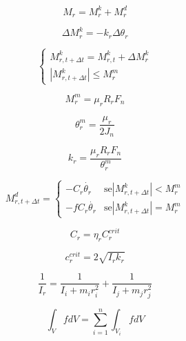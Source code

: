 		\begin{equation}
			M_{r} = M^k_{r} + M^d_{r}
		\end{equation}
		
		\begin{equation}
			\Delta M^k_{r} = -k_{r} \Delta \theta_{r}
		\end{equation}

		\begin{equation}
				\begin{cases}
					M^k_{r,t+\Delta t} = M^k_{r,t} + \Delta M^k_{r} \\
					\left| M^k_{r,t + \Delta t} \right| \leq M^m_{r}
				\end{cases}
		\end{equation}
		
		\begin{equation}
			M^m_{r} = \mu_{r} R_{r} F_{n}
		\end{equation}

		\begin{equation}
			\theta^m_{r} = \frac{\mu_{r}}{2J_{n}}
		\end{equation}

		\begin{equation}
			k_{r} = \frac{\mu_{r}R_{r}F_{n}}{\theta^m_{r}}
		\end{equation}
		
		\begin{equation}
				M^d_{r,t + \Delta t}
				= 
				\begin{cases}
					-C_{r}\dot{\theta_{r}} & \text{se} \left| M^k_{r,t+ \Delta t} \right| < M^m_{r} \\
					-fC_{r}\dot{\theta_{r}} & \text{se} \left| M^k_{r,t + \Delta t} \right| = M^m_{r}
				\end{cases}
		\end{equation}
		
		\begin{equation}
			C_{r} = \eta_{r}C^{crit}_{r}
		\end{equation}

		\begin{equation}
			c^{crit}_{r} = 2\sqrt{I_{r}k_{r}}
		\end{equation}

		\begin{equation}
			\frac{1}{I_{r}} = \frac{1}{I_{i}+m_{i}r^2_{i}} + \frac{1}{I_{j}+m_{j}r^2_{j}}
		\end{equation}
		
		\begin{equation}\label{eq:2.9}
			\int_{V}^{} f dV = \sum_{i=1}^{n} \int_{V_{i}}^{} f dV
		\end{equation}
		
